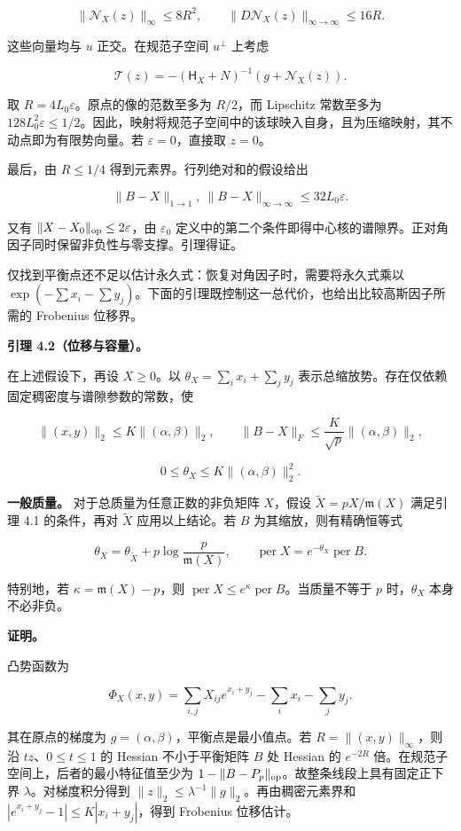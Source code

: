 \documentclass[11pt,a4paper]{article}
\begin{document}
\[
\|\mathcal N_X(z)\|_\infty\le8R^2,\qquad \|D\mathcal N_X(z)\|_{\infty\to\infty}\le16R.
\]

这些向量均与 \(u\) 正交。在规范子空间 \(u^\perp\) 上考虑

\[
\mathcal T(z)=-(\mathsf H_X+N)^{-1}(g+\mathcal N_X(z)).
\]

取 \(R=4L_0\varepsilon\)。原点的像的范数至多为 \(R/2\)，而 Lipschitz 常数至多为 \(128L_0^2\varepsilon\le1/2\)。因此，映射将规范子空间中的该球映入自身，且为压缩映射，其不动点即为有限势向量。若 \(\varepsilon=0\)，直接取 \(z=0\)。

最后，由 \(R\le1/4\) 得到元素界。行列绝对和的假设给出

\[
\|B-X\|_{1\to1},\ \|B-X\|_{\infty\to\infty}\le32L_0\varepsilon.
\]

又有 \(\|X-X_0\|_{\rm op}\le2\varepsilon\)，由 \(\varepsilon_0\) 定义中的第二个条件即得中心核的谱隙界。正对角因子同时保留非负性与零支撑。引理得证。

仅找到平衡点还不足以估计永久式：恢复对角因子时，需要将永久式乘以 \(\exp(-\sum x_i-\sum y_j)\)。下面的引理既控制这一总代价，也给出比较高斯因子所需的 Frobenius 位移界。

\textbf{引理 4.2（位移与容量）。}

在上述假设下，再设 \(X\ge0\)。以 \(\theta_X=\sum_i x_i+\sum_j y_j\) 表示总缩放势。存在仅依赖固定稠密度与谱隙参数的常数，使

\[
\|(x,y)\|_2\le K\|(\alpha,\beta)\|_2,\qquad \|B-X\|_F\le\frac K{\sqrt p}\|(\alpha,\beta)\|_2,
\]

\[
0\le\theta_X\le K\|(\alpha,\beta)\|_2^2.
\]

\textbf{一般质量。} 对于总质量为任意正数的非负矩阵 \(X\)，假设 \(\widetilde X=pX/\mathfrak m(X)\) 满足引理 4.1 的条件，再对 \(\widetilde X\) 应用以上结论。若 \(B\) 为其缩放，则有精确恒等式

\[
\theta_X=\theta_{\widetilde X}+p\log\frac p{\mathfrak m(X)},\qquad \operatorname{per}X=e^{-\theta_X}\operatorname{per}B.
\]

特别地，若 \(\kappa=\mathfrak m(X)-p\)，则 \(\operatorname{per}X\le e^\kappa\operatorname{per}B\)。当质量不等于 \(p\) 时，\(\theta_X\) 本身不必非负。

\textbf{证明。}

凸势函数为

\[
\Phi_X(x,y)=\sum_{i,j}X_{ij}e^{x_i+y_j}-\sum_i x_i-\sum_j y_j.
\]

其在原点的梯度为 \(g=(\alpha,\beta)\)，平衡点是最小值点。若 \(R=\|(x,y)\|_\infty\)，则沿 \(tz\)、\(0\le t\le1\) 的 Hessian 不小于平衡矩阵 \(B\) 处 Hessian 的 \(e^{-2R}\) 倍。在规范子空间上，后者的最小特征值至少为 \(1-\|B-P_p\|_{\rm op}\)。故整条线段上具有固定正下界 \(\lambda\)。对梯度积分得到 \(\|z\|_2\le\lambda^{-1}\|g\|_2\)。再由稠密元素界和 \(|e^{x_i+y_j}-1|\le K|x_i+y_j|\)，得到 Frobenius 位移估计。
\end{document}
